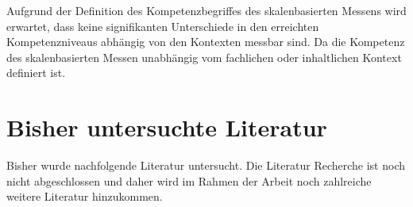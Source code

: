 \documentclass[paper=a4, fontsize=12pt, parskip=half]{scrartcl} %
\begin{document}
Aufgrund der Definition des Kompetenzbegriffes des skalenbasierten Messens wird erwartet, dass  keine signifikanten Unterschiede in den erreichten Kompetenzniveaus abhängig von den Kontexten messbar sind. Da die Kompetenz des skalenbasierten Messen unabhängig vom fachlichen oder inhaltlichen Kontext definiert ist. 

\section{Bisher untersuchte Literatur}

Bisher wurde nachfolgende Literatur untersucht. Die Literatur Recherche ist noch nicht abgeschlossen und daher wird im Rahmen der Arbeit noch zahlreiche weitere Literatur hinzukommen.



\printbibliography[heading=none]
\end{document}
